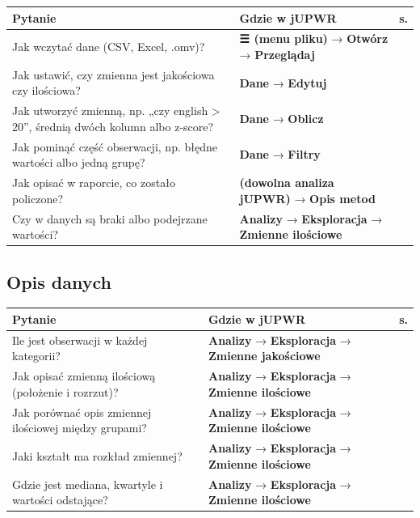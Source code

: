\documentclass[
  polish,
  10pt,
  a4paper,
  DIV=11,
  numbers=noendperiod]{scrartcl}
\newcommand{\jmenu}[1]{{\color{upwraccent}\small #1}}
\begin{document}
\begin{longtable*}{@{}p{6.4cm}p{9.2cm}r@{}}
\toprule
\textbf{Pytanie} & \textbf{Gdzie w jUPWR} & \textbf{s.} \\
\midrule
\endhead
Jak wczytać dane (CSV, Excel, .omv)? & \jmenu{\textbf{{\symfont ☰} (menu pliku)} → \textbf{Otwórz} → \textbf{Przeglądaj}} & \pageref{w:otworz-plik} \\[2pt]
Jak ustawić, czy zmienna jest jakościowa czy ilościowa? & \jmenu{\textbf{Dane} → \textbf{Edytuj}} & \pageref{w:poziom-pomiaru} \\[2pt]
Jak utworzyć zmienną, np. „czy english \textgreater{} 20”, średnią dwóch kolumn albo z-score? & \jmenu{\textbf{Dane} → \textbf{Oblicz}} & \pageref{w:oblicz-zmienna} \\[2pt]
Jak pominąć część obserwacji, np. błędne wartości albo jedną grupę? & \jmenu{\textbf{Dane} → \textbf{Filtry}} & \pageref{w:filtry} \\[2pt]
Jak opisać w raporcie, co zostało policzone? & \jmenu{\textbf{(dowolna analiza jUPWR)} → \textbf{Opis metod}} & \pageref{w:opis-metod} \\[2pt]
Czy w danych są braki albo podejrzane wartości? & \jmenu{\textbf{Analizy} → \textbf{Eksploracja} → \textbf{Zmienne ilościowe}} & \pageref{w:braki-odstajace} \\[2pt]
\bottomrule
\end{longtable*}


\subsection{Opis danych}\label{opis-danych}

\begin{longtable*}{@{}p{6.4cm}p{9.2cm}r@{}}
\toprule
\textbf{Pytanie} & \textbf{Gdzie w jUPWR} & \textbf{s.} \\
\midrule
\endhead
Ile jest obserwacji w każdej kategorii? & \jmenu{\textbf{Analizy} → \textbf{Eksploracja} → \textbf{Zmienne jakościowe}} & \pageref{w:tabela-licznosci} \\[2pt]
Jak opisać zmienną ilościową (położenie i rozrzut)? & \jmenu{\textbf{Analizy} → \textbf{Eksploracja} → \textbf{Zmienne ilościowe}} & \pageref{w:statystyki-opisowe} \\[2pt]
Jak porównać opis zmiennej ilościowej między grupami? & \jmenu{\textbf{Analizy} → \textbf{Eksploracja} → \textbf{Zmienne ilościowe}} & \pageref{w:porownanie-grup-opis} \\[2pt]
Jaki kształt ma rozkład zmiennej? & \jmenu{\textbf{Analizy} → \textbf{Eksploracja} → \textbf{Zmienne ilościowe}} & \pageref{w:histogram} \\[2pt]
Gdzie jest mediana, kwartyle i wartości odstające? & \jmenu{\textbf{Analizy} → \textbf{Eksploracja} → \textbf{Zmienne ilościowe}} & \pageref{w:pudelkowy} \\[2pt]
\bottomrule
\end{longtable*}
\end{document}
